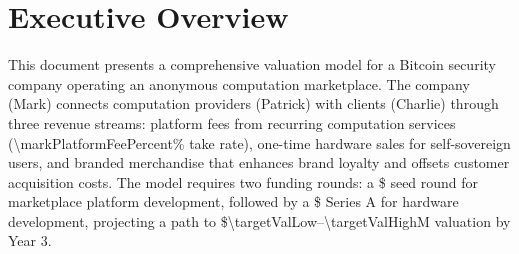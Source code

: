 
\section*{Executive Overview}
This document presents a comprehensive valuation model for a Bitcoin security company operating an anonymous computation marketplace. The company (Mark) connects computation providers (Patrick) with clients (Charlie) through three revenue streams: platform fees from recurring computation services (\num{\markPlatformFeePercent}\% take rate), one-time hardware sales for self-sovereign users, and branded merchandise that enhances brand loyalty and offsets customer acquisition costs. The model requires two funding rounds: a \$\numint{\seedAmount} seed round for marketplace platform development, followed by a \$\numint{\seriesAAmount} Series A for hardware development, projecting a path to \$\num{\targetValLow}--\num{\targetValHigh}M valuation by Year 3.
